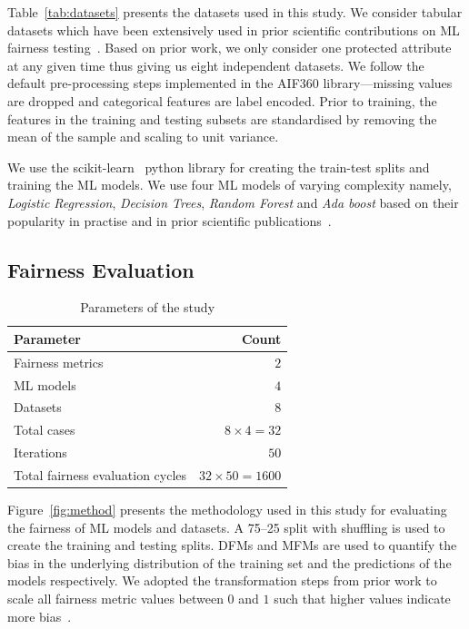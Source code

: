 \documentclass[conference,review,anonymous]{IEEEtran}
\begin{document}
Table \ref{tab:datasets} presents the datasets used in this study. We
consider tabular datasets which have been extensively used in prior
scientific contributions on ML fairness
testing \cite{zhang2021ignorance,biswas2020machine,biswas2021fair,chen2022fairness}. Based
on prior work, we only consider one protected attribute at any given
time thus giving us eight independent datasets. We follow the default
pre-processing steps implemented in the AIF360 library---missing
values are dropped and categorical features are label encoded. Prior
to training, the features in the training and testing subsets are
standardised by removing the mean of the sample and scaling to unit
variance.

We use the scikit-learn \cite{pedregosa2011scikit} python library for
creating the train-test splits and training the ML models. We use four
ML models of varying complexity namely, \emph{Logistic Regression},
\emph{Decision Trees}, \emph{Random Forest} and \emph{Ada boost} based
on their popularity in practise and in prior scientific
publications \cite{zhang2021ignorance,biswas2021fair,biswas2020machine}.

\subsection{Fairness Evaluation}\label{sec:method-fair-eval}

\begin{table}
  \centering
  \caption{Parameters of the study}
  \begin{tabular}{l r}
    \hline
    \textbf{Parameter} & \textbf{Count}\\
    \hline
    Fairness metrics & $2$\\
    ML models & $4$\\
    Datasets & $8$\\
    Total cases & $8\times4=32$\\
    Iterations & $50$\\
    Total fairness evaluation cycles & $32\times50=1600$\\
    \hline
  \end{tabular}
  \label{tab:parameters}
\end{table}

Figure \ref{fig:method} presents the methodology used in this study
for evaluating the fairness of ML models and datasets. A 75--25 split
with shuffling is used to create the training and testing splits. DFMs
and MFMs are used to quantify the bias in the underlying distribution
of the training set and the predictions of the models respectively. We
adopted the transformation steps from prior work to scale all fairness
metric values between $0$ and $1$ such that higher values indicate
more bias \cite{zhang2021ignorance,hort2021fairea}.
\end{document}

